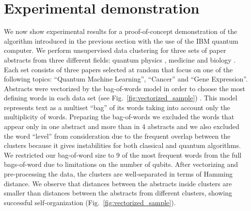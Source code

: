 \documentclass[%
  pra, aps, physrev,
  showkeys,
  twocolumn,
  showpacs,
  superscriptaddress,
  amsmath,amssymb,
  10pt
]{revtex4-2}
\begin{document}
























\section{Experimental demonstration}

We now show experimental results for a proof-of-concept demonstration of the algorithm introduced in the previous section with the use of the IBM quantum computer.  We perform unsupervised data clustering for three sets of paper abstracts from three different fields:
quantum physics \cite{qml0, qml1, qml2},
medicine \cite{med0, med1, med2}
and biology \cite{bio0, bio1, bio2}.
Each set consists of three papers selected at random that focus on one of the following topics:
``Quantum Machine Learning'',
``Cancer''
and ``Gene Expression''.
Abstracts were vectorized by the bag-of-words \cite{weikang2016} model in order to choose the most defining words in each data set (see Fig.~\ref{fig:vectorized_sample}) \cite{mctear2016}.
This model represents text as a multiset ``bag'' of its words taking into account only the multiplicity of words.
Preparing the bag-of-words we excluded the words that appear only in one abstract and more than in 4 abstracts and we also excluded the word ``level'' from consideration due to the frequent overlap between the clusters because it gives instabilities for both classical and quantum algorithms.
We restricted our bag-of-word size to 9 of the most frequent words from the full bags-of-word  due to limitations on the number of qubits.
After vectorizing and pre-processing  the data, the clusters are well-separated in terms of Hamming distance.
We observe that distances between the abstracts inside clusters are smaller than distances between the abstracts from different clusters,
showing successful self-organization (Fig.~\ref{fig:vectorized_sample}).
\end{document}
